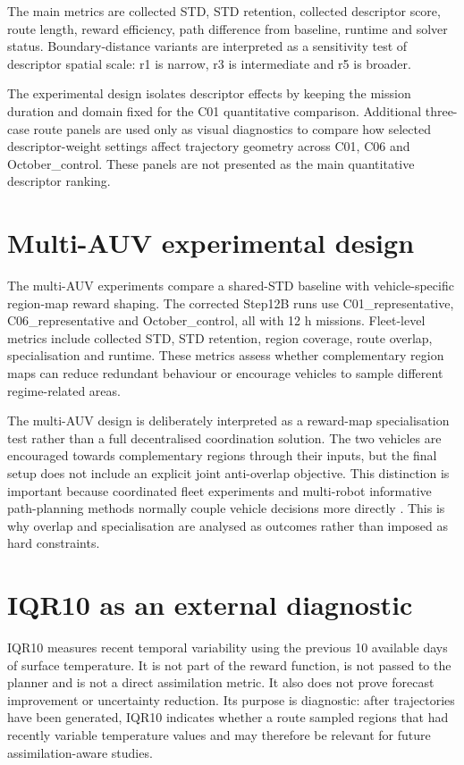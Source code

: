 The main metrics are collected STD, STD retention, collected descriptor score, route length, reward efficiency, path difference from baseline, runtime and solver status. Boundary-distance variants are interpreted as a sensitivity test of descriptor spatial scale: r1 is narrow, r3 is intermediate and r5 is broader.

The experimental design isolates descriptor effects by keeping the mission duration and domain fixed for the C01 quantitative comparison. Additional three-case route panels are used only as visual diagnostics to compare how selected descriptor-weight settings affect trajectory geometry across C01, C06 and October\_control. These panels are not presented as the main quantitative descriptor ranking.

\section{Multi-AUV experimental design}

The multi-AUV experiments compare a shared-STD baseline with vehicle-specific region-map reward shaping. The corrected Step12B runs use C01\_representative, C06\_representative and October\_control, all with 12 h missions. Fleet-level metrics include collected STD, STD retention, region coverage, route overlap, specialisation and runtime. These metrics assess whether complementary region maps can reduce redundant behaviour or encourage vehicles to sample different regime-related areas.

The multi-AUV design is deliberately interpreted as a reward-map specialisation test rather than a full decentralised coordination solution. The two vehicles are encouraged towards complementary regions through their inputs, but the final setup does not include an explicit joint anti-overlap objective. This distinction is important because coordinated fleet experiments and multi-robot informative path-planning methods normally couple vehicle decisions more directly \parencite{fiorelli2006multiauv,leonard2010gliderfleet,cao2013multirobotipp}. This is why overlap and specialisation are analysed as outcomes rather than imposed as hard constraints.

\section{IQR10 as an external diagnostic}

IQR10 measures recent temporal variability using the previous 10 available days of surface temperature. It is not part of the reward function, is not passed to the planner and is not a direct assimilation metric. It also does not prove forecast improvement or uncertainty reduction. Its purpose is diagnostic: after trajectories have been generated, IQR10 indicates whether a route sampled regions that had recently variable temperature values and may therefore be relevant for future assimilation-aware studies.


